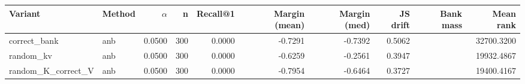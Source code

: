\begin{tabular}{l l r r r r r r r r}
\toprule
Variant & Method & $\alpha$ & n & Recall@1 & Margin (mean) & Margin (med) & JS drift & Bank mass & Mean rank \\
\midrule
correct\_bank & anb & 0.0500 & 300 & 0.0000 & -0.7291 & -0.7392 & 0.5062 &  & 32700.3200 \\
random\_kv & anb & 0.0500 & 300 & 0.0000 & -0.6259 & -0.2561 & 0.3947 &  & 19932.4867 \\
random\_K\_correct\_V & anb & 0.0500 & 300 & 0.0000 & -0.7954 & -0.6464 & 0.3727 &  & 19400.4167 \\
\bottomrule
\end{tabular}
